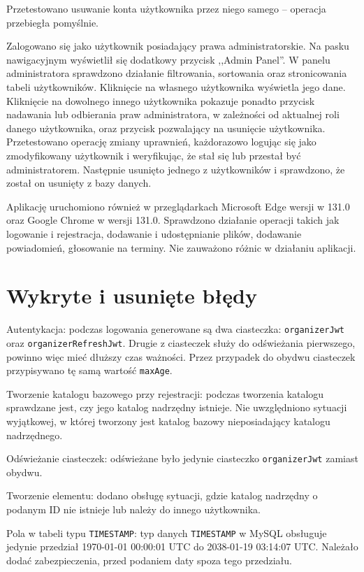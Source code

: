 \documentclass[a4paper,twoside,12pt]{book}
\begin{document}
Przetestowano usuwanie konta użytkownika przez niego samego -- operacja przebiegła pomyślnie.

Zalogowano się jako użytkownik posiadający prawa administratorskie. Na pasku nawigacyjnym wyświetlił się dodatkowy przycisk ,,Admin Panel''. W panelu administratora sprawdzono działanie filtrowania, sortowania oraz stronicowania tabeli użytkowników. Kliknięcie na własnego użytkownika wyświetla jego dane. Kliknięcie na dowolnego innego użytkownika pokazuje ponadto przycisk nadawania lub odbierania praw administratora, w zależności od aktualnej roli danego użytkownika, oraz przycisk pozwalający na usunięcie użytkownika. Przetestowano operację zmiany uprawnień, każdorazowo logując się jako zmodyfikowany użytkownik i weryfikując, że stał się lub przestał być administratorem. Następnie usunięto jednego z użytkowników i sprawdzono, że został on usunięty z bazy danych.

Aplikację uruchomiono również w przeglądarkach Microsoft Edge wersji w 131.0 oraz Google Chrome w wersji 131.0. Sprawdzono działanie operacji takich jak logowanie i rejestracja, dodawanie i udostępnianie plików, dodawanie powiadomień, głosowanie na terminy. Nie zauważono różnic w działaniu aplikacji.

\section{Wykryte i usunięte błędy}

Autentykacja: podczas logowania generowane są dwa ciasteczka: \texttt{organizerJwt} oraz \texttt{organizerRefreshJwt}. Drugie z ciasteczek służy do odświeżania pierwszego, powinno więc mieć dłuższy czas ważności. Przez przypadek do obydwu ciasteczek przypisywano tę samą wartość \texttt{maxAge}.

Tworzenie katalogu bazowego przy rejestracji: podczas tworzenia katalogu sprawdzane jest, czy jego katalog nadrzędny istnieje. Nie uwzględniono sytuacji wyjątkowej, w której tworzony jest katalog bazowy nieposiadający katalogu nadrzędnego.

Odświeżanie ciasteczek: odświeżane było jedynie ciasteczko \texttt{organizerJwt} zamiast obydwu. 

Tworzenie elementu: dodano obsługę sytuacji, gdzie katalog nadrzędny o podanym ID nie istnieje lub należy do innego użytkownika.

Pola w tabeli typu \texttt{TIMESTAMP}: typ danych \texttt{TIMESTAMP} w MySQL obsługuje jedynie przedział 1970-01-01 00:00:01 UTC do 2038-01-19 03:14:07 UTC. Należało dodać zabezpieczenia, przed podaniem daty spoza tego przedziału.
\end{document}
